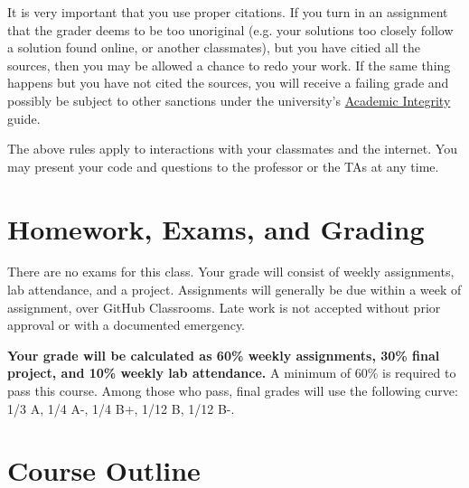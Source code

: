 \documentclass{article}
\begin{document}
It is very important that you use proper citations.  If you turn in an assignment that the grader deems to be too unoriginal (e.g. your solutions too closely follow a solution found online, or another classmates), but you have citied all the sources, then you may be allowed a chance to redo your work.  If the same thing happens but you have not cited the sources, you will receive a failing grade and possibly be subject to other sanctions under the university's \href{https://college.uchicago.edu/advising/academic-integrity-student-conduct}{Academic Integrity} guide.

The above rules apply to interactions with your classmates and the internet. You may present your code and questions to the professor or the TAs at any time.

\section*{Homework, Exams, and Grading}
There are no exams for this class.  Your grade will consist of weekly assignments, lab attendance, and a project.  Assignments will generally be due within a week of assignment, over GitHub Classrooms.  Late work is not accepted without prior approval or with a documented emergency.

\textbf{Your grade will be calculated as 60\% weekly assignments, 30\% final project, and 10\% weekly lab attendance.}  A minimum of 60\% is required to pass this course.  Among those who pass, final grades will use the following curve: 1/3 A, 1/4 A-, 1/4 B+, 1/12 B, 1/12 B-.

\section*{Course Outline}
\end{document}
